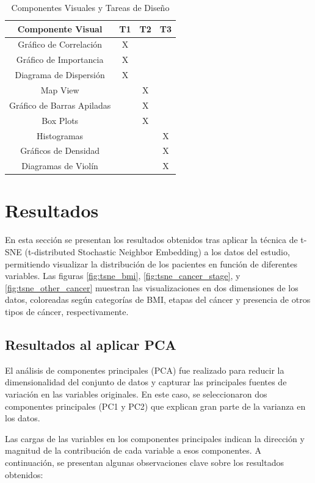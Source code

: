 \documentclass[10pt,journal,compsoc]{IEEEtran}
\begin{document}
\begin{table}[h!]
\centering
\caption{Componentes Visuales y Tareas de Diseño}
\begin{tabular}{|c|c|c|c|}
\hline
\textbf{Componente Visual} & \textbf{T1} & \textbf{T2} & \textbf{T3} \\ \hline
Gráfico de Correlación & X &  &  \\ \hline
Gráfico de Importancia & X &  &  \\ \hline
Diagrama de Dispersión & X &  &  \\ \hline
Map View &  & X &  \\ \hline
Gráfico de Barras Apiladas &  & X &  \\ \hline
Box Plots &  & X &  \\ \hline
Histogramas &  &  & X \\ \hline
Gráficos de Densidad &  &  & X \\ \hline
Diagramas de Violín &  &  & X \\ \hline
\end{tabular}
\label{tab:visualtareas}
\end{table}


\section{Resultados}

En esta sección se presentan los resultados obtenidos tras aplicar la técnica de t-SNE (t-distributed Stochastic Neighbor Embedding) a los datos del estudio, permitiendo visualizar la distribución de los pacientes en función de diferentes variables. Las figuras \ref{fig:tsne_bmi}, \ref{fig:tsne_cancer_stage}, y \ref{fig:tsne_other_cancer} muestran las visualizaciones en dos dimensiones de los datos, coloreadas según categorías de BMI, etapas del cáncer y presencia de otros tipos de cáncer, respectivamente.

\subsection{Resultados al aplicar PCA}

El análisis de componentes principales (PCA) fue realizado para reducir la dimensionalidad del conjunto de datos y capturar las principales fuentes de variación en las variables originales. En este caso, se seleccionaron dos componentes principales (PC1 y PC2) que explican gran parte de la varianza en los datos.

Las cargas de las variables en los componentes principales indican la dirección y magnitud de la contribución de cada variable a esos componentes. A continuación, se presentan algunas observaciones clave sobre los resultados obtenidos:
\end{document}
